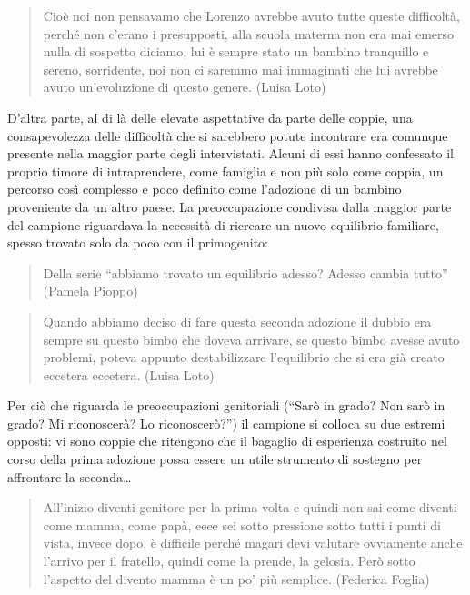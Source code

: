 \documentclass[12pt,oneside,svgnames]{memoir}
\newenvironment{quotationb}%
{\color{maincolor}\begin{leftbar}\begin{quotation}}%
{\end{quotation}\end{leftbar}\ignorespacesafterend}
\begin{document}
\begin{quotationb}
Cioè noi non pensavamo che Lorenzo avrebbe avuto tutte queste
difficoltà, perché non c'erano i presupposti, alla scuola materna non
era mai emerso nulla di sospetto diciamo, lui è sempre stato un bambino
tranquillo e sereno, sorridente, noi non ci saremmo mai immaginati che
lui avrebbe avuto un'evoluzione di questo genere. (Luisa Loto)
\end{quotationb}

D'altra parte, al di là delle elevate aspettative da parte delle coppie,
una consapevolezza delle difficoltà che si sarebbero potute incontrare
era comunque presente nella maggior parte degli intervistati. Alcuni di
essi hanno confessato il proprio timore di intraprendere, come famiglia
e non più solo come coppia, un percorso così complesso e poco definito
come l'adozione di un bambino proveniente da un altro paese. La
preoccupazione condivisa dalla maggior parte del campione riguardava la
necessità di ricreare un nuovo equilibrio familiare, spesso trovato solo
da poco con il primogenito:

\begin{quotationb}
Della serie ``abbiamo trovato un equilibrio adesso? Adesso cambia
tutto'' (Pamela Pioppo)
\end{quotationb}

\begin{quotationb}
Quando abbiamo deciso di fare questa seconda adozione il dubbio era
sempre su questo bimbo che doveva arrivare, se questo bimbo avesse avuto
problemi, poteva appunto destabilizzare l'equilibrio che si era già
creato eccetera eccetera. (Luisa Loto)
\end{quotationb}

Per ciò che riguarda le preoccupazioni genitoriali (``Sarò in grado? Non
sarò in grado? Mi riconoscerà? Lo riconoscerò?'') il campione si colloca
su due estremi opposti: vi sono coppie che ritengono che il bagaglio di
esperienza costruito nel corso della prima adozione possa essere un
utile strumento di sostegno per affrontare la seconda\ldots{}

\begin{quotationb}
All'inizio diventi genitore per la prima volta e quindi non sai come
diventi come mamma, come papà, eeee sei sotto pressione sotto tutti i
punti di vista, invece dopo, è difficile perché magari devi valutare
ovviamente anche l'arrivo per il fratello, quindi come la prende, la
gelosia. Però sotto l'aspetto del divento mamma è un po' più semplice.
(Federica Foglia)
\end{quotationb}
\end{document}
